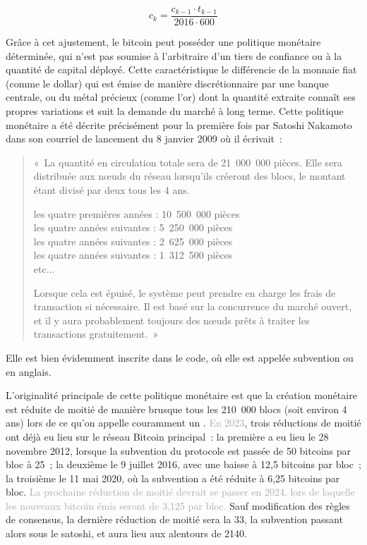 { \small
\[
c_{k} = \frac{c_{k-1} \cdot t_{k-1}}{2016 \cdot 600}
\]
}

Grâce à cet ajustement, le bitcoin peut posséder une politique monétaire déterminée, qui n'est pas soumise à l'arbitraire d'un tiers de confiance ou à la quantité de capital déployé. Cette caractéristique le différencie de la monnaie fiat (comme le dollar) qui est émise de manière discrétionnaire par une banque centrale, ou du métal précieux (comme l'or) dont la quantité extraite connaît ses propres variations et suit la demande du marché à long terme. Cette politique monétaire a été décrite précisément pour la première fois par Satoshi Nakamoto dans son courriel de lancement du 8 janvier 2009 où il écrivait~:

\begin{quote}
«~La quantité en circulation totale sera de 21~000~000 pièces. Elle sera distribuée aux nœuds du réseau lorsqu'ils créeront des blocs, le montant étant divisé par deux tous les 4 ans.

les quatre premières années : 10~500~000 pièces\\
les quatre années suivantes : 5~250~000 pièces\\
les quatre années suivantes : 2~625~000 pièces\\
les quatre années suivantes : 1~312~500 pièces\\
etc...

Lorsque cela est épuisé, le système peut prendre en charge les frais de transaction si nécessaire. Il est basé sur la concurrence du marché ouvert, et il y aura probablement toujours des nœuds prêts à traiter les transactions gratuitement.~»
\end{quote}

Elle est bien évidemment inscrite dans le code, où elle est appelée subvention ou  en anglais.

L'originalité principale de cette politique monétaire est que la création monétaire est réduite de moitié de manière brusque tous les 210~000 blocs (soit environ 4 ans) lors de ce qu'on appelle couramment un . \textcolor{darkgray}{En 2023}, trois réductions de moitié ont déjà eu lieu sur le réseau Bitcoin principal~: la première a eu lieu le 28 novembre 2012, lorsque la subvention du protocole est passée de 50 bitcoins par bloc à 25~; la deuxième le 9 juillet 2016, avec une baisse à 12,5 bitcoins par bloc~; la troisième le 11 mai 2020, où la subvention a été réduite à 6,25 bitcoins par bloc. \textcolor{darkgray}{La prochaine réduction de moitié devrait se passer en 2024, lors de laquelle les nouveaux bitcoin émis seront de 3,125 par bloc.} Sauf modification des règles de consensus, la dernière réduction de moitié sera la 33\ieme{}, la subvention passant alors sous le satoshi, et aura lieu aux alentours de 2140.


